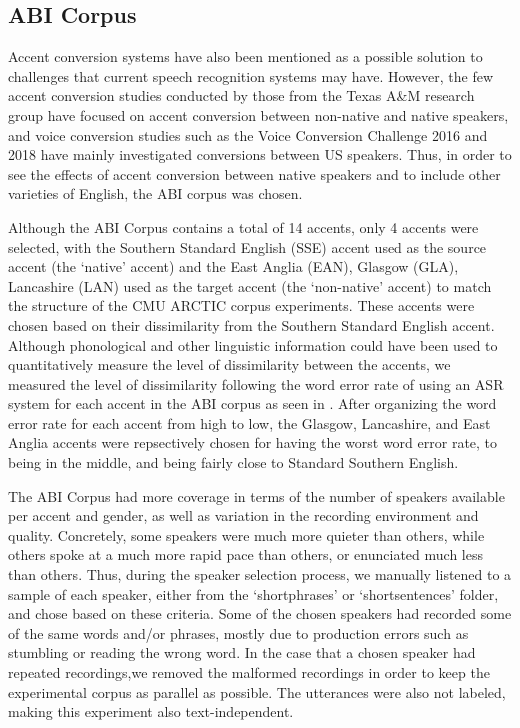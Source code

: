\documentclass
[
    a4paper,
    twoside,
    12pt,
]
{report}
\begin{document}
\hypertarget{abi-corpus}{%
\subsection{ABI Corpus}\label{abi-corpus}}

Accent conversion systems have also been mentioned as a possible
solution to challenges that current speech recognition systems may have.
However, the few accent conversion studies
\parencite{aryal2014, aryal2014a, aryal2015, zhao2018a} conducted by
those from the Texas A\&M research group have focused on accent
conversion between non-native and native speakers, and voice conversion
studies such as the Voice Conversion Challenge 2016 and 2018
\parencite{toda2016, lorenzo-trueba2018} have mainly investigated
conversions between US speakers. Thus, in order to see the effects of
accent conversion between native speakers and to include other varieties
of English, the ABI corpus was chosen.

Although the ABI Corpus contains a total of 14 accents, only 4 accents
were selected, with the Southern Standard English (SSE) accent used as
the source accent (the `native' accent) and the East Anglia (EAN),
Glasgow (GLA), Lancashire (LAN) used as the target accent (the
`non-native' accent) to match the structure of the CMU ARCTIC corpus
experiments. These accents were chosen based on their dissimilarity from
the Southern Standard English accent. Although phonological and other
linguistic information could have been used to quantitatively measure
the level of dissimilarity between the accents, we measured the level of
dissimilarity following the word error rate of using an ASR system for
each accent in the ABI corpus as seen in \textcite{najafian2014}. After
organizing the word error rate for each accent from high to low, the
Glasgow, Lancashire, and East Anglia accents were repsectively chosen
for having the worst word error rate, to being in the middle, and being
fairly close to Standard Southern English.

The ABI Corpus had more coverage in terms of the number of speakers
available per accent and gender, as well as variation in the recording
environment and quality. Concretely, some speakers were much more
quieter than others, while others spoke at a much more rapid pace than
others, or enunciated much less than others. Thus, during the speaker
selection process, we manually listened to a sample of each speaker,
either from the `shortphrases' or `shortsentences' folder, and chose
based on these criteria. Some of the chosen speakers had recorded some
of the same words and/or phrases, mostly due to production errors such
as stumbling or reading the wrong word. In the case that a chosen
speaker had repeated recordings,we removed the malformed recordings in
order to keep the experimental corpus as parallel as possible. The
utterances were also not labeled, making this experiment also
text-independent.
\end{document}

